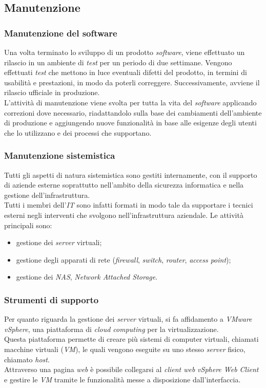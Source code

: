 
\subsection{Manutenzione}
 
 \subsubsection{Manutenzione del software}
Una volta terminato lo sviluppo di un prodotto \textit{software}, viene effettuato un rilascio in un ambiente di \textit{test} per un periodo di due settimane. Vengono effettuati \textit{test} che mettono in luce eventuali difetti del prodotto, in termini di usabilità e prestazioni, in modo da poterli correggere. Successivamente, avviene il rilascio ufficiale in produzione.\\
L'attività di manutenzione viene svolta per tutta la vita del \textit{software} applicando correzioni dove necessario, riadattandolo sulla base dei cambiamenti dell'ambiente di produzione e aggiungendo nuove funzionalità in base alle esigenze degli utenti che lo utilizzano e dei processi che supportano.
 
 \subsubsection{Manutenzione sistemistica}
Tutti gli aspetti di natura sistemistica sono gestiti internamente, con il supporto di aziende esterne soprattutto nell'ambito della sicurezza informatica e nella gestione dell'infrastruttura.\\ Tutti i membri dell'\textit{IT} sono infatti formati in modo tale da supportare i tecnici esterni negli interventi che svolgono nell'infrastruttura aziendale. Le attività principali sono:
\begin{itemize}
	\item gestione dei \textit{server} virtuali;
	\item gestione degli apparati di rete (\textit{firewall}, \textit{switch}, \textit{router}, \textit{access point});
	\item gestione dei \textit{NAS}, \textit{Network Attached Storage}.
\end{itemize}

\subsubsection{Strumenti di supporto}
Per quanto riguarda la gestione dei \textit{server} virtuali, si fa affidamento a \textit{VMware vSphere}, una piattaforma di \textit{cloud computing} per la virtualizzazione.\\ Questa piattaforma permette di creare più sistemi di computer virtuali, chiamati macchine virtuali (\textit{VM}), le quali vengono eseguite su uno stesso \textit{server} fisico, chiamato \textit{host}.\\ Attraverso una pagina \textit{web} è possibile collegarsi al \textit{client web} \textit{vSphere Web Client} e gestire le \textit{VM} tramite le funzionalità messe a disposizione dall'interfaccia.

